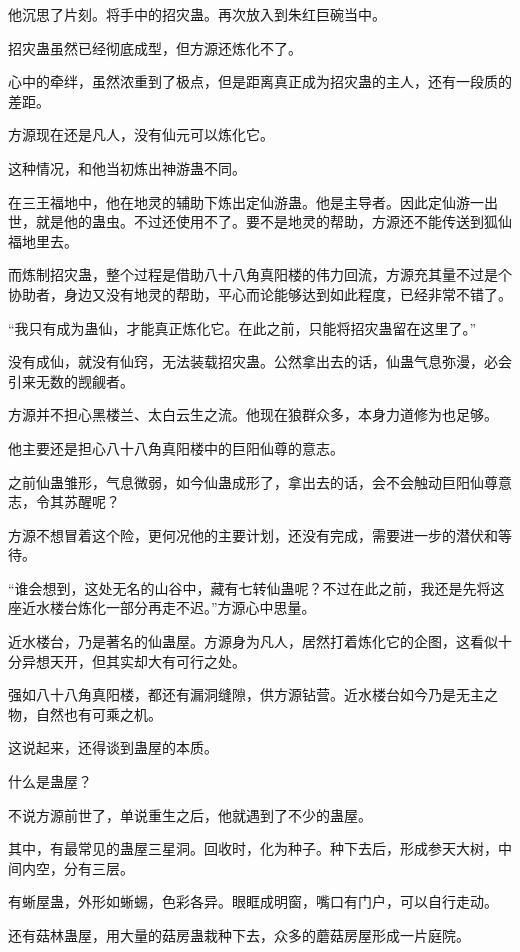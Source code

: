 \begin{this_body}
他沉思了片刻。将手中的招灾蛊。再次放入到朱红巨碗当中。

招灾蛊虽然已经彻底成型，但方源还炼化不了。

心中的牵绊，虽然浓重到了极点，但是距离真正成为招灾蛊的主人，还有一段质的差距。

方源现在还是凡人，没有仙元可以炼化它。

这种情况，和他当初炼出神游蛊不同。

在三王福地中，他在地灵的辅助下炼出定仙游蛊。他是主导者。因此定仙游一出世，就是他的蛊虫。不过还使用不了。要不是地灵的帮助，方源还不能传送到狐仙福地里去。

而炼制招灾蛊，整个过程是借助八十八角真阳楼的伟力回流，方源充其量不过是个协助者，身边又没有地灵的帮助，平心而论能够达到如此程度，已经非常不错了。

“我只有成为蛊仙，才能真正炼化它。在此之前，只能将招灾蛊留在这里了。”

没有成仙，就没有仙窍，无法装载招灾蛊。公然拿出去的话，仙蛊气息弥漫，必会引来无数的觊觎者。

方源并不担心黑楼兰、太白云生之流。他现在狼群众多，本身力道修为也足够。

他主要还是担心八十八角真阳楼中的巨阳仙尊的意志。

之前仙蛊雏形，气息微弱，如今仙蛊成形了，拿出去的话，会不会触动巨阳仙尊意志，令其苏醒呢？

方源不想冒着这个险，更何况他的主要计划，还没有完成，需要进一步的潜伏和等待。

“谁会想到，这处无名的山谷中，藏有七转仙蛊呢？不过在此之前，我还是先将这座近水楼台炼化一部分再走不迟。”方源心中思量。

近水楼台，乃是著名的仙蛊屋。方源身为凡人，居然打着炼化它的企图，这看似十分异想天开，但其实却大有可行之处。

强如八十八角真阳楼，都还有漏洞缝隙，供方源钻营。近水楼台如今乃是无主之物，自然也有可乘之机。

这说起来，还得谈到蛊屋的本质。

什么是蛊屋？

不说方源前世了，单说重生之后，他就遇到了不少的蛊屋。

其中，有最常见的蛊屋三星洞。回收时，化为种子。种下去后，形成参天大树，中间内空，分有三层。

有蜥屋蛊，外形如蜥蜴，色彩各异。眼眶成明窗，嘴口有门户，可以自行走动。

还有菇林蛊屋，用大量的菇房蛊栽种下去，众多的蘑菇房屋形成一片庭院。


\end{this_body}
